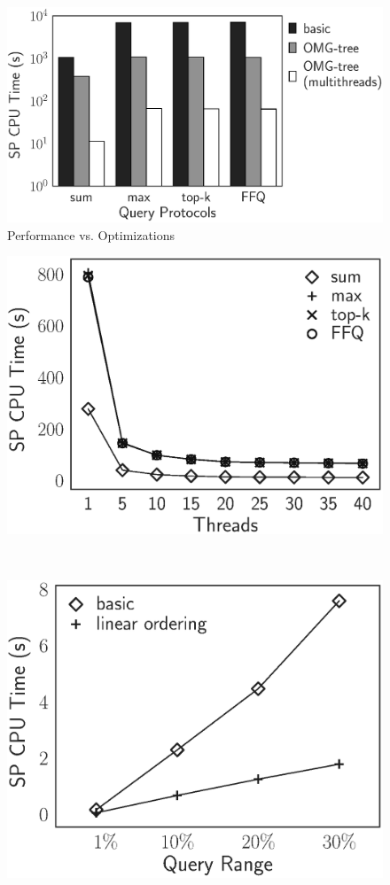 \begin{figure}[t]
  \centering
  \includegraphics[width=0.5\linewidth]{exp-figs/aggregate-queries/opt.eps}
  \caption{Performance vs. Optimizations}\label{fig:aggregate-queries:opt}
\end{figure}

\begin{figure}[t]
  \begin{minipage}[t]{0.5\linewidth}
    \centering
    \includegraphics[width=.8\linewidth]{exp-figs/aggregate-queries/threads.eps}
    \label{fig:aggregate-queries:mt}
  \end{minipage}~%
  \begin{minipage}[t]{0.5\linewidth}
    \centering
    \includegraphics[width=.75\linewidth]{exp-figs/aggregate-queries/linear.eps}
    \label{fig:aggregate-queries:linear}
  \end{minipage}
\end{figure}

